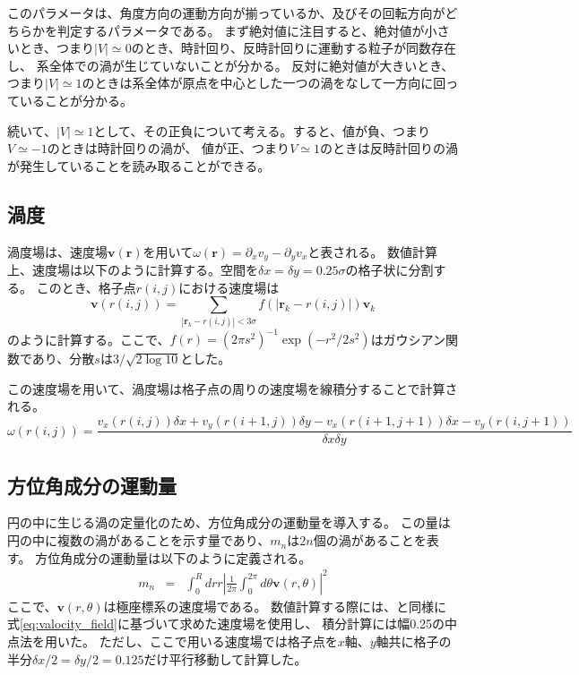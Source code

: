 \documentclass[/Users/ikedahajime/GitHub/reserch/master_report/thesis]{subfiles}
\begin{document}
このパラメータは、角度方向の運動方向が揃っているか、及びその回転方向がどちらかを判定するパラメータである。
まず絶対値に注目すると、絶対値が小さいとき、つまり$|V|\simeq 0$のとき、時計回り、反時計回りに運動する粒子が同数存在し、
系全体での渦が生じていないことが分かる。
反対に絶対値が大きいとき、つまり$|V|\simeq 1$のときは系全体が原点を中心とした一つの渦をなして一方向に回っていることが分かる。


続いて、$|V|\simeq 1$として、その正負について考える。すると、値が負、つまり$V\simeq -1$のときは時計回りの渦が、
値が正、つまり$V\simeq 1$のときは反時計回りの渦が発生していることを読み取ることができる。


\subsection{渦度}\label{subsec:def_vortex}
渦度場は、速度場$\bm{v}(\bm{r})$を用いて$\omega(\bm{r})=\partial_x v_y -\partial_y v_x$と表される。
数値計算上、速度場は以下のように計算する。空間を$\delta x=\delta y=0.25 \sigma$の格子状に分割する。
このとき、格子点$r(i,j)$における速度場は%
\begin{equation}\label{eq:valocity_field}
    \bm{v}(r(i,j))=\sum_{\left|\bm{r}_k-r(i,j)\right|<3\sigma} f(\left|\bm{r}_k-r(i,j)\right|)\bm{v}_k
\end{equation}
のように計算する。ここで、$f(r)=(2\pi s^2)^{-1} \exp(-r^2/2s^2)$はガウシアン関数であり、分散$s$は$3/\sqrt{2\log 10}$とした。


この速度場を用いて、渦度場は格子点の周りの速度場を線積分することで計算される。
\begin{equation}
    \omega (r(i,j))=\frac{v_x(r(i,j))\delta x +v_y(r(i+1,j)) \delta y -v_x(r(i+1,j+1))\delta x -v_y(r(i,j+1))}{\delta x \delta y}
\end{equation}

\subsection{方位角成分の運動量}
円の中に生じる渦の定量化のため、方位角成分の運動量を導入する\cite{nishiguchiVortexReversalPrecursor2024}。
この量は円の中に複数の渦があることを示す量であり、$m_n$は$2n$個の渦があることを表す。
方位角成分の運動量は以下のように定義される。
\begin{eqnarray}
    m_n &=& \int_0^R dr r\left|\frac{1}{2\pi}\int_0^{2\pi}d\theta \bm{v}(r,\theta)\right|^2
\end{eqnarray}
ここで、$\bm{v}(r,\theta)$は極座標系の速度場である。
数値計算する際には、と同様に式\eqref{eq:valocity_field}に基づいて求めた速度場を使用し、
積分計算には幅0.25の中点法を用いた。
ただし、ここで用いる速度場では格子点を$x$軸、$y$軸共に格子の半分$\delta x/2=\delta y/2=0.125$だけ平行移動して計算した。
\end{document}

